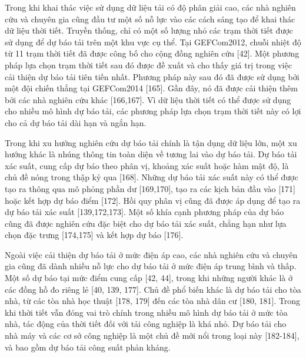 \documentclass[utf8]{frontiersSCNS} %
\begin{document}
Trong khi khai thác việc sử dụng dữ liệu tải có độ phân giải cao, các nhà nghiên cứu và chuyên gia cũng đầu tư một số nỗ lực vào các cách sáng tạo để khai thác dữ liệu thời tiết. Truyền thống, chỉ có một số lượng nhỏ các trạm thời tiết được sử dụng để dự báo tải trên một khu vực cụ thể. Tại GEFCom2012, chuỗi nhiệt độ từ 11 trạm thời tiết đã được công bố cho cộng đồng nghiên cứu [42]. Một phương pháp lựa chọn trạm thời tiết sau đó được đề xuất và cho thấy giá trị trong việc cải thiện dự báo tải tiên tiến nhất. Phương pháp này sau đó đã được sử dụng bởi một đội chiến thắng tại GEFCom2014 [165]. Gần đây, nó đã được cải thiện thêm bởi các nhà nghiên cứu khác [166,167]. Vì dữ liệu thời tiết có thể được sử dụng cho nhiều mô hình dự báo tải, các phương pháp lựa chọn trạm thời tiết này có lợi cho cả dự báo tải dài hạn và ngắn hạn.

Trong khi xu hướng nghiên cứu dự báo tải chính là tận dụng dữ liệu lớn, một xu hướng khác là nhúng thông tin toàn diện về tương lai vào dự báo tải. Dự báo tải xác suất, cung cấp dự báo theo phân vị, khoảng xác suất hoặc hàm mật độ, là chủ đề nóng trong thập kỷ qua [168]. Những dự báo tải xác suất này có thể được tạo ra thông qua mô phỏng phần dư [169,170], tạo ra các kịch bản đầu vào [171] hoặc kết hợp dự báo điểm [172]. Hồi quy phân vị cũng đã được áp dụng để tạo ra dự báo tải xác suất [139,172,173]. Một số khía cạnh phương pháp của dự báo cũng đã được nghiên cứu đặc biệt cho dự báo tải xác suất, chẳng hạn như lựa chọn đặc trưng [174,175] và kết hợp dự báo [176].

Ngoài việc cải thiện dự báo tải ở mức điện áp cao, các nhà nghiên cứu và chuyên gia cũng đã dành nhiều nỗ lực cho dự báo tải ở mức điện áp trung bình và thấp. Một số dự báo tại mức điểm cung cấp [42, 44], trong khi những người khác là ở các đồng hồ đo riêng lẻ [40, 139, 177]. Chủ đề phổ biến khác là dự báo tải cho tòa nhà, từ các tòa nhà học thuật [178, 179] đến các tòa nhà dân cư [180, 181]. Trong khi thời tiết vẫn đóng vai trò chính trong nhiều mô hình dự báo tải ở mức tòa nhà, tác động của thời tiết đối với tải công nghiệp là khá nhỏ. Dự báo tải cho nhà máy và các cơ sở công nghiệp là một chủ đề mới nổi trong loại này [182-184], và bao gồm dự báo tải công suất phản kháng.
\end{document}
